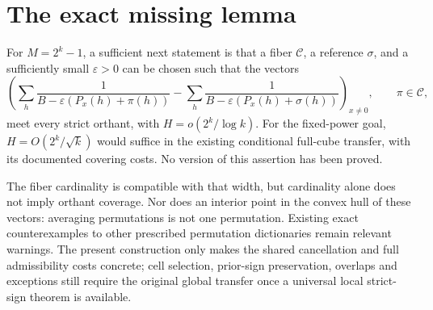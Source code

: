 \documentclass{article}
\begin{document}
\section{The exact missing lemma}
For $M=2^k-1$, a sufficient next statement is that a fiber
$\mathcal C$, a reference $\sigma$, and a sufficiently small
$\varepsilon>0$ can be chosen such that the vectors
\[
 \left(\sum_h\frac1{B-\varepsilon(P_x(h)+\pi(h))}
 -\sum_h\frac1{B-\varepsilon(P_x(h)+\sigma(h))}\right)_{x\neq0},
 \qquad \pi\in\mathcal C,
\]
meet every strict orthant, with $H=o(2^k/\log k)$. For the fixed-power
goal, $H=O(2^k/\sqrt{k})$ would suffice in the existing conditional
full-cube transfer, with its documented covering costs. No version of
this assertion has been proved.

The fiber cardinality is compatible with that width, but cardinality
alone does not imply orthant coverage. Nor does an interior point in the
convex hull of these vectors: averaging permutations is not one
permutation. Existing exact counterexamples to other prescribed
permutation dictionaries remain relevant warnings. The present
construction only makes the shared cancellation and full admissibility
costs concrete; cell selection, prior-sign preservation, overlaps and
exceptions still require the original global transfer once a universal
local strict-sign theorem is available.
\end{document}

